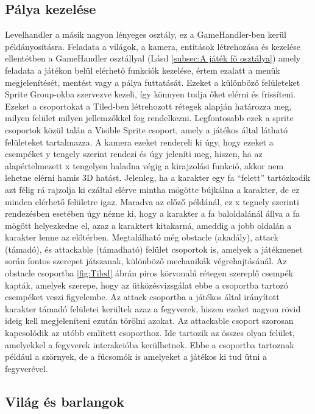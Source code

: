 \subsection{Pálya kezelése} \label{subsec:Pálya kezelése}
 Levelhandler a másik nagyon lényeges osztály, ez a GameHandler-ben kerül példányosításra. Feladata a világok, a kamera, entitások létrehozása és kezelése ellentétben a GameHandler osztállyal (Lásd \ref{subsec:A játék fő osztálya}) amely feladata a játékon belül elérhető funkciók kezelése, értem ezalatt a menük megjelenítését, mentést vagy a pálya futtatását. 
Ezeket a különböző felületeket Sprite Group-okba szervezve kezeli, így könnyen tudja őket elérni és frissíteni. Ezeket a csoportokat a Tiled-ben létrehozott rétegek alapján határozza meg, milyen felület milyen jellemzőkkel fog rendelkezni.
Legfontosabb ezek a sprite csoportok közül talán a Visible Sprite csoport, amely a játékos által látható felületeket tartalmazza. A kamera ezeket rendereli ki úgy, hogy ezeket a csempéket y tengely szerint rendezi és úgy jeleníti meg, hiszen, ha az alapértelmezett x tengelyen haladna végig a kirajzolási funkció, akkor nem lehetne elérni hamis 3D hatást. Jelenleg, ha a karakter egy fa ``felett'' tartózkodik azt félig rá rajzolja ki ezáltal elérve mintha mögötte bújkálna a karakter, de ez minden elérhető felületre igaz. Maradva az előző példánál, ez x tegnely szerinti rendezésben esetében úgy nézne ki, hogy a karakter a fa baloldalánál állva a fa mögött helyezkedne el, azaz a karaktert kitakarná, ameddig a jobb oldalán a karakter lenne az előtérben. 
Megtalálható még obstacle (akadály), attack (támadó), és attackable (támadható) felület csoportok is, amelyek a játékmenet során fontos szerepet játszanak, különböző mechanikák végrehajtásánál. Az obstacle csoportba \ref{fig:Tiled} ábrán piros körvonalú rétegen szereplő csempék kapták, amelyek szerepe, hogy az ütközésvizsgálat ebbe a csoportba tartozó csempéket veszi figyelembe. Az attack csoportba a játékos által irányított karakter támadó felületei kerültek azaz a fegyverek, hiszen ezeket nagyon rövid ideig kell megjeleníteni ezután törölni azokat. Az attackable csoport szorosan kapcsolódik az utóbb említett csoporthoz. Ide tartozik az összes olyan felület, amelyekkel a fegyverek interakcióba kerülhetnek. Ebbe a csoportba tartoznak például a szörnyek, de a fűcsomók is amelyeket a játékos ki tud ütni a fegyverével. 

\subsection{Világ és barlangok} \label{subsec:Világ és barlangok}

